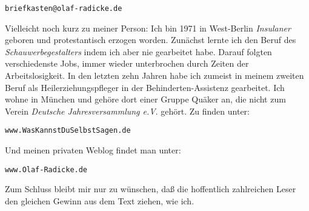 
\begin{center}
\texttt{briefkasten@olaf-radicke.de}
\end{center}

Vielleicht noch kurz zu meiner Person: Ich bin 1971 in West-Berlin
\textit{Insulaner} geboren und protestantisch erzogen worden. Zunächst lernte
ich den Beruf des \textit{Schauwerbegestalters} indem ich aber nie gearbeitet
habe. Darauf folgten verschiedenste Jobs, immer wieder unterbrochen durch Zeiten
der Arbeitslosigkeit. In den letzten zehn Jahren habe ich zumeist in meinem
zweiten Beruf als Heilerziehungspfleger in der Behinderten-Assistenz gearbeitet.
Ich wohne in München und gehöre dort einer Gruppe Quäker an, die nicht zum
Verein \textit{Deutsche Jahresversammlung e.V}. gehört. Zu finden unter:

\begin{center}
\texttt{www.WasKannstDuSelbstSagen.de}
\end{center}

Und meinen privaten Weblog findet man unter:

\begin{center}
\texttt{www.Olaf-Radicke.de}
\end{center}

Zum Schluss bleibt mir nur zu wünschen, daß die hoffentlich zahlreichen Leser
den gleichen Gewinn aus dem Text ziehen, wie ich.



